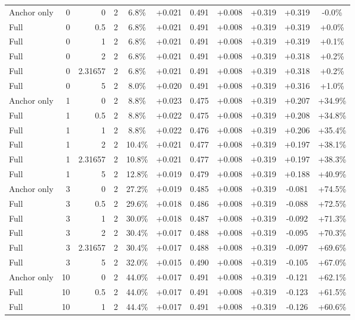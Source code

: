 \begin{table}[htbp]
\begin{tabular}{lrrrccccccc}
Anchor only & 0 & 0 & 2 & 6.8\% & +0.021 & 0.491 & +0.008 & +0.319 & +0.319 & -0.0\% \\
Full & 0 & 0.5 & 2 & 6.8\% & +0.021 & 0.491 & +0.008 & +0.319 & +0.319 & +0.0\% \\
Full & 0 & 1 & 2 & 6.8\% & +0.021 & 0.491 & +0.008 & +0.319 & +0.319 & +0.1\% \\
Full & 0 & 2 & 2 & 6.8\% & +0.021 & 0.491 & +0.008 & +0.319 & +0.318 & +0.2\% \\
Full & 0 & 2.31657 & 2 & 6.8\% & +0.021 & 0.491 & +0.008 & +0.319 & +0.318 & +0.2\% \\
Full & 0 & 5 & 2 & 8.0\% & +0.020 & 0.491 & +0.008 & +0.319 & +0.316 & +1.0\% \\
Anchor only & 1 & 0 & 2 & 8.8\% & +0.023 & 0.475 & +0.008 & +0.319 & +0.207 & +34.9\% \\
Full & 1 & 0.5 & 2 & 8.8\% & +0.022 & 0.475 & +0.008 & +0.319 & +0.208 & +34.8\% \\
Full & 1 & 1 & 2 & 8.8\% & +0.022 & 0.476 & +0.008 & +0.319 & +0.206 & +35.4\% \\
Full & 1 & 2 & 2 & 10.4\% & +0.021 & 0.477 & +0.008 & +0.319 & +0.197 & +38.1\% \\
Full & 1 & 2.31657 & 2 & 10.8\% & +0.021 & 0.477 & +0.008 & +0.319 & +0.197 & +38.3\% \\
Full & 1 & 5 & 2 & 12.8\% & +0.019 & 0.479 & +0.008 & +0.319 & +0.188 & +40.9\% \\
Anchor only & 3 & 0 & 2 & 27.2\% & +0.019 & 0.485 & +0.008 & +0.319 & -0.081 & +74.5\% \\
Full & 3 & 0.5 & 2 & 29.6\% & +0.018 & 0.486 & +0.008 & +0.319 & -0.088 & +72.5\% \\
Full & 3 & 1 & 2 & 30.0\% & +0.018 & 0.487 & +0.008 & +0.319 & -0.092 & +71.3\% \\
Full & 3 & 2 & 2 & 30.4\% & +0.017 & 0.488 & +0.008 & +0.319 & -0.095 & +70.3\% \\
Full & 3 & 2.31657 & 2 & 30.4\% & +0.017 & 0.488 & +0.008 & +0.319 & -0.097 & +69.6\% \\
Full & 3 & 5 & 2 & 32.0\% & +0.015 & 0.490 & +0.008 & +0.319 & -0.105 & +67.0\% \\
Anchor only & 10 & 0 & 2 & 44.0\% & +0.017 & 0.491 & +0.008 & +0.319 & -0.121 & +62.1\% \\
Full & 10 & 0.5 & 2 & 44.0\% & +0.017 & 0.491 & +0.008 & +0.319 & -0.123 & +61.5\% \\
Full & 10 & 1 & 2 & 44.4\% & +0.017 & 0.491 & +0.008 & +0.319 & -0.126 & +60.6\% \\

\end{tabular}
\end{table}
